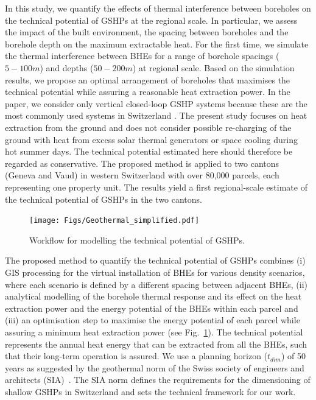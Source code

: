 In this study, we quantify the effects of thermal interference between boreholes on the technical potential of GSHPs at the regional scale. 
In particular, we assess the impact of the built environment, the spacing between boreholes and the borehole depth on the maximum extractable heat.
For the first time, we simulate the thermal interference between BHEs for a range of borehole spacings ($5-100m$) and depths ($50-200m$) at regional scale. 
Based on the simulation results, we propose an optimal arrangement of boreholes that maximises the technical potential while assuring a reasonable heat extraction power.
In the paper, we consider only vertical closed-loop GSHP systems because these are the most commonly used systems in Switzerland \cite{link_statistik_2019}.
The present study focuses on heat extraction from the ground and does not consider possible re-charging of the ground with heat from excess solar thermal generators or space cooling during hot summer days.
The technical potential estimated here should therefore be regarded as conservative.
The proposed method is applied to two cantons (Geneva and Vaud) in western Switzerland with over 80,000 parcels, each representing one property unit.
The results yield a first regional-scale estimate of the technical potential of GSHPs in the two cantons.

\begin{figure}[tb]
\centering\texttt{[image: Figs/Geothermal\_simplified.pdf]}
\caption{Workflow for modelling the technical potential of GSHPs.}
\label{fig:workflow_BHE}
\end{figure}

The proposed method to quantify the technical potential of GSHPs combines 
(i) GIS processing for the virtual installation of BHEs for various density scenarios, where each scenario is defined by a different spacing between adjacent BHEs,
(ii) analytical modelling of the borehole thermal response and its effect on the heat extraction power and the energy potential of the BHEs within each parcel  %
and (iii) an optimisation step to maximise the energy potential of each parcel while assuring a minimum heat extraction power (see Fig.~\ref{fig:workflow_BHE}). %
The technical potential represents the annual heat energy that can be extracted from all the BHEs, such that their long-term operation is assured. 
We use a planning horizon ($t_{dim}$) of 50 years as suggested by the geothermal norm of the Swiss society of engineers and architects (SIA)~\cite{sia_sondes_2010}. 
The SIA norm defines the requirements for the dimensioning of shallow GSHPs in Switzerland and sets the technical framework for our work.

